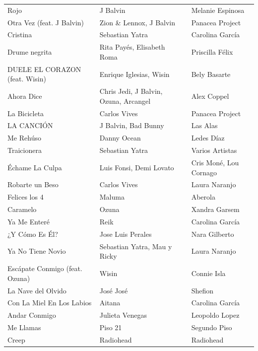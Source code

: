 \begin{longtable}{p{} p{} p{}}
Rojo & J Balvin & Melanie Espinosa \\
Otra Vez (feat. J Balvin) & Zion \& Lennox, J Balvin & Panacea Project \\
Cristina & Sebastian Yatra & Carolina García \\
Drume negrita & Rita Payés, Elisabeth Roma & Priscilla Félix \\
DUELE EL CORAZON (feat. Wisin) & Enrique Iglesias, Wisin & Bely Basarte \\
Ahora Dice & Chris Jedi, J Balvin, Ozuna, Arcangel & Alex Coppel \\
La Bicicleta & Carlos Vives & Panacea Project \\
LA CANCIÓN & J Balvin, Bad Bunny & Las Alas \\
Me Rehúso & Danny Ocean & Ledes Díaz \\
Traicionera & Sebastian Yatra & Varios Artistas \\
Échame La Culpa & Luis Fonsi, Demi Lovato & Cris Moné, Lou Cornago \\
Robarte un Beso & Carlos Vives & Laura Naranjo \\
Felices los 4 & Maluma & Aberola \\
Caramelo & Ozuna & Xandra Garsem \\
Ya Me Enteré & Reik & Carolina García \\
¿Y Cómo Es Él? & Jose Luis Perales & Nara Gilberto \\
Ya No Tiene Novio & Sebastian Yatra, Mau y Ricky & Laura Naranjo \\
Escápate Conmigo (feat. Ozuna) & Wisin & Connie Isla \\
La Nave del Olvido & José José & Shefion \\
Con La Miel En Los Labios & Aitana & Carolina García \\
Andar Conmigo & Julieta Venegas & Leopoldo Lopez \\
Me Llamas & Piso 21 & Segundo Piso \\
Creep & Radiohead & Radiohead \\

\end{longtable}


